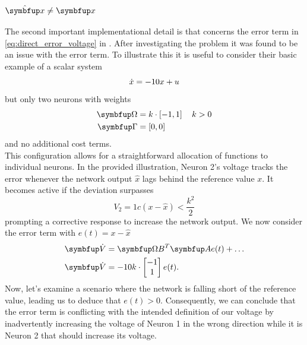 \subsubsection{$\hat{\bmu{x}} \neq \bmu{x}$}
The second important implementational detail is that concerns the error term in \cref{eq:direct_error_voltage} in \cite{huang_spiking_2019}. After investigating the problem it was found to be an issue with the error term. To illustrate this it is useful to consider their basic example of a scalar system
\begin{equation}
\dot{x} = -10x + u\\
\end{equation}
but only two neurons with weights
\begin{equation}
\begin{aligned}
\bmu{\Omega} &= k\cdot\left[-1 , 1\right] \quad k>0\\
\bmu{\Gamma} &= \left[0,0\right]
\end{aligned}
\end{equation}
and no additional cost terms.\\
This configuration allows for a straightforward allocation of functions to individual neurons. In the provided illustration, Neuron 2's voltage tracks the error whenever the network output $\hat{x}$ lags behind the reference value $x$. It becomes active if the deviation surpasses
\begin{equation}
V_2 = 1c\left(x-\hat{x} \right) < \frac{k^2}{2}
\end{equation}
prompting a corrective response to increase the network output.
We now consider the error term with $e(t) = x-\hat{x}$
\begin{equation}
\begin{aligned}
\bmu{\dot{V}}&= \bmu{\Omega B}^T \bmu{A}e(t) + \dots\\
\bmu{\dot{V}}&=  -10k \cdot\begin{bmatrix}-1\\1\end{bmatrix}e(t).
\end{aligned}
\end{equation}
Now, let's examine a scenario where the network is falling short of the reference value, leading us to deduce that $e(t)>0$. Consequently, we can conclude that the error term is conflicting with the intended definition of our voltage by inadvertently increasing the voltage of Neuron 1 in the wrong direction while it is Neuron 2 that should increase its voltage.\\
